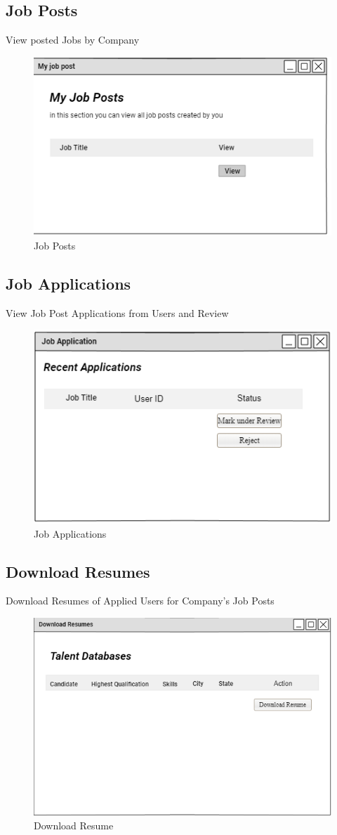 \documentclass[a4paper,12pt]{report}
\begin{document}
\subsection {Job Posts}
View posted Jobs by Company
\begin{figure}[bph]
	\centering
	\includegraphics[width=.6\linewidth]{img/company/postedjobs}
	\caption{Job Posts}
\end{figure}

\subsection {Job Applications}
View Job Post Applications from Users and Review
\begin{figure}[bph]
	\centering
	\includegraphics[width=.7\linewidth]{img/company/jobapltns}
	\caption{Job Applications}
\end{figure}
\pagebreak

\subsection {Download Resumes}
Download Resumes of Applied Users for Company's Job Posts
\begin{figure}[bph]
	\centering
	\includegraphics[width=.7\linewidth]{img/company/dwnldresm}
	\caption{Download Resume}
\end{figure}
\end{document}
